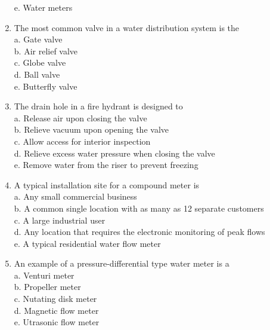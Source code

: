 \begin{enumerate}[1.]
e. Water meters\\

\item The most common valve in a water distribution system is the\\
a. Gate valve\\

b. Air relief valve\\

c. Globe valve\\

d. Ball valve\\

e. Butterfly valve\\

\item The drain hole in a fire hydrant is designed to\\
a. Release air upon closing the valve\\

b. Relieve vacuum upon opening the valve\\

c. Allow access for interior inspection\\

d. Relieve excess water pressure when closing the valve\\

e. Remove water from the riser to prevent freezing\\


\item A typical installation site for a compound meter is\\
a. Any small commercial business\\

b. A common single location with as many as 12 separate customers\\

c. A large industrial user\\

d. Any location that requires the electronic monitoring of peak flows\\

e. A typical residential water flow meter \\

\item An example of a pressure-differential type water meter is a\\
a. Venturi meter\\
b. Propeller meter\\
c. Nutating disk meter\\
d. Magnetic flow meter\\
e. Utrasonic flow meter\\



\end{enumerate}
